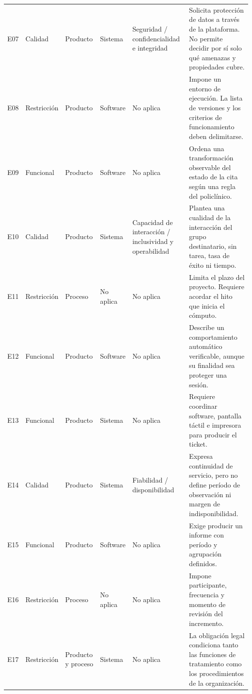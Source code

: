 \documentclass[11pt,a4paper]{article}
\begin{document}
{\begin{longtable}{
    @{}
    P{0.65cm}
    P{1.7cm}
    P{1.7cm}
    P{1.8cm}
    P{2.7cm}
    P{5.6cm}
    @{}
}
E07 &
Calidad &
Producto &
Sistema &
Seguridad / confidencialidad e integridad &
Solicita protección de datos a través de la plataforma. No permite
decidir por sí solo qué amenazas y propiedades cubre.
\\[4pt]

E08 &
Restricción &
Producto &
Software &
No aplica &
Impone un entorno de ejecución. La lista de versiones y los
criterios de funcionamiento deben delimitarse.
\\[4pt]

E09 &
Funcional &
Producto &
Software &
No aplica &
Ordena una transformación observable del estado de la cita según
una regla del policlínico.
\\[4pt]

E10 &
Calidad &
Producto &
Sistema &
Capacidad de interacción / inclusividad y operabilidad &
Plantea una cualidad de la interacción del grupo destinatario,
sin tarea, tasa de éxito ni tiempo.
\\[4pt]

E11 &
Restricción &
Proceso &
No aplica &
No aplica &
Limita el plazo del proyecto. Requiere acordar el hito que inicia
el cómputo.
\\[4pt]

E12 &
Funcional &
Producto &
Software &
No aplica &
Describe un comportamiento automático verificable, aunque su
finalidad sea proteger una sesión.
\\[4pt]

E13 &
Funcional &
Producto &
Sistema &
No aplica &
Requiere coordinar software, pantalla táctil e impresora para
producir el ticket.
\\[4pt]

E14 &
Calidad &
Producto &
Sistema &
Fiabilidad / disponibilidad &
Expresa continuidad de servicio, pero no define período de
observación ni margen de indisponibilidad.
\\[4pt]

E15 &
Funcional &
Producto &
Software &
No aplica &
Exige producir un informe con período y agrupación definidos.
\\[4pt]

E16 &
Restricción &
Proceso &
No aplica &
No aplica &
Impone participante, frecuencia y momento de revisión
del incremento.
\\[4pt]

E17 &
Restricción &
Producto y proceso &
Sistema &
No aplica &
La obligación legal condiciona tanto las funciones de tratamiento
como los procedimientos de la organización.
\\[4pt]


\end{longtable}}
\end{document}
